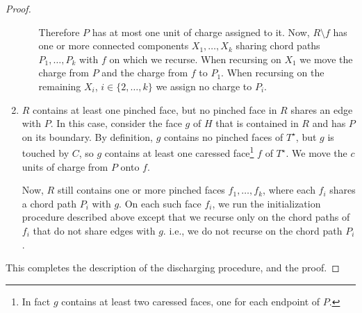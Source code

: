\documentclass{patmorin}
\newcommand{\dual}[1]{{#1}^\star}
\begin{document}
\begin{proof}
\begin{enumerate}
\begin{enumerate}
        Therefore $P$ has at most one unit of charge assigned to it.
        Now, $R\setminus f$ has one or more connected components
        $X_1,\ldots,X_k$ sharing chord paths $P_1,\ldots,P_k$ with $f$
        on which we recurse.  When recursing on $X_1$ we move the charge
        from $P$ and the charge from $f$ to $P_1$.  When recursing on
        the remaining $X_i$, $i\in\{2,\ldots,k\}$ we assign no charge
        to $P_i$.
  \end{enumerate}
  \item $R$ contains at least one pinched face, but no pinched face in $R$
  shares an edge with $P$.  In this case, consider the face $g$ of $H$
  that is contained in $R$ and has $P$ on its boundary. By definition,
  $g$ contains no pinched faces of $\dual{T}$, but $g$ is touched by $C$,
  so $g$ contains at least one caressed face\footnote{In fact $g$ contains at
  least two caressed faces, one for each endpoint of $P$.} $f$ of $\dual{T}$.
  We move the $c$ units of charge from $P$ onto $f$.

  Now, $R$ still contains one or more pinched faces
  $f_1,\ldots,f_k$, where each $f_i$ shares a chord path $P_i$ with $g$.
  On each such face $f_i$, we run the initialization procedure described
  above except that we recurse only on the chord paths of $f_i$ that
  do not share edges with $g$. i.e., we do not recurse on the chord
  path $P_i$.
\end{enumerate}
   This completes the description of the discharging procedure, and the proof.
\end{proof}
\end{document}
